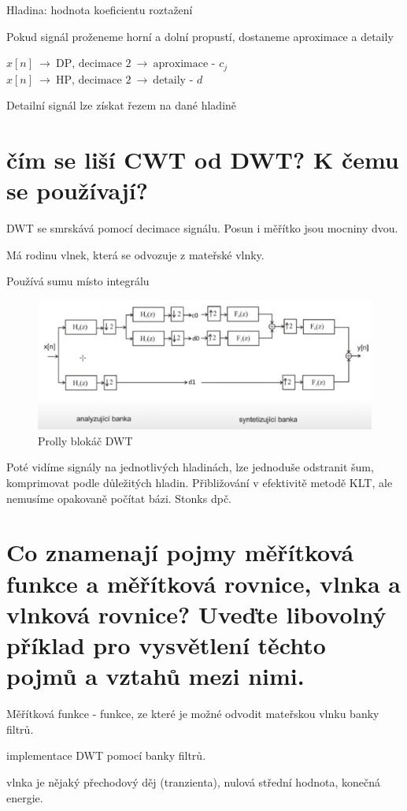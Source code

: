 \documentclass[a4paper,12pt]{article}   %
\begin{document}
Hladina: hodnota koeficientu roztažení

Pokud signál proženeme horní a dolní propustí, dostaneme aproximace a detaily

$x[n]~\rightarrow~\text{DP, decimace 2}~\rightarrow~\text{aproximace - }c_j$\\
$x[n]~\rightarrow~\text{HP, decimace 2}~\rightarrow~\text{detaily - }d$

Detailní signál lze získat řezem na dané hladině


\section{čím se liší CWT od DWT? K čemu se používají?}
DWT se smrskává pomocí decimace signálu. Posun i měřítko jsou mocniny dvou.

Má rodinu vlnek, která se odvozuje z mateřské vlnky.

Používá sumu místo integrálu

\begin{figure}
        \centering
        \includegraphics[width=.8\textwidth]{fig/DWT_blokac.png}
        \caption*{Prolly blokáč DWT}
\end{figure}

Poté vidíme signály na jednotlivých hladinách, lze jednoduše odstranit šum, komprimovat podle důležitých hladin. Přibližování v efektivitě metodě KLT, ale nemusíme opakovaně počítat bázi. Stonks dpč. 


\section{Co znamenají pojmy měřítková funkce a měřítková rovnice, vlnka a vlnková rovnice? Uveďte libovolný příklad pro vysvětlení těchto pojmů a vztahů mezi nimi.}
Měřítková funkce - funkce, ze které je možné odvodit mateřskou vlnku banky filtrů. 

implementace DWT pomocí banky filtrů.

vlnka je nějaký přechodový děj (tranzienta), nulová střední hodnota, konečná energie.
\end{document}
